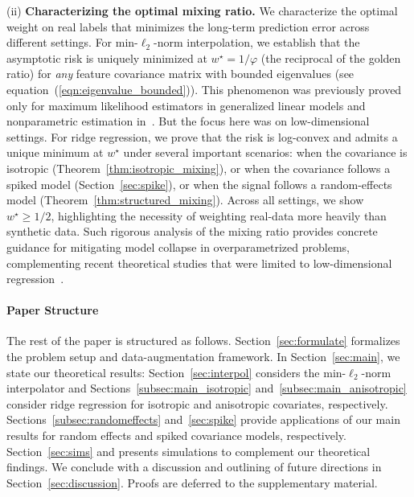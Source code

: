 \documentclass[10pt]{article}
\def\eqref#1{equation~(\ref{#1})}
\numberwithin{thm}{section}
\numberwithin{remark}{section}
\numberwithin{ex}{section}
\numberwithin{ass}{section}
\numberwithin{defn}{section}
\numberwithin{lemma}{section}
\numberwithin{corollary}{section}
\numberwithin{prop}{section}
\numberwithin{equation}{section}
\begin{document}
(ii) \textbf{Characterizing the optimal mixing ratio.}
We characterize the optimal weight on real labels that minimizes the long-term prediction error across different settings.
For min-$\ell_2$-norm interpolation, we establish that the asymptotic risk is uniquely minimized at $w^\star = 1/\varphi$ (the reciprocal of the golden ratio) for \emph{any} feature covariance matrix with bounded eigenvalues (see \eqref{eqn:eigenvalue_bounded}).
This phenomenon was previously proved only for maximum likelihood estimators in generalized linear models and nonparametric estimation in~\cite{he2025golden}. But the focus here was on low-dimensional settings. For ridge regression, we prove that the risk is log-convex and admits a unique minimum at $w^\star$ under several important scenarios:  when the covariance is isotropic (Theorem~\ref{thm:isotropic_mixing}), or when the covariance follows a spiked model (Section~\ref{sec:spike}), or when the signal follows a random-effects model (Theorem~\ref{thm:structured_mixing}). Across all settings, we show $w^\star \geq 1/2$, highlighting the necessity of weighting real-data more heavily than synthetic data. Such rigorous analysis of the mixing ratio provides concrete guidance for mitigating model collapse in overparametrized problems, complementing recent theoretical studies that were limited to low-dimensional regression~\cite{gerstgrasser2024inevitable,dey2024universality}.

\paragraph{Paper Structure}
The rest of the paper is structured as follows. Section~\ref{sec:formulate} formalizes the problem setup and data-augmentation framework. In Section~\ref{sec:main}, we state our theoretical results: Section~\ref{sec:interpol} considers the min-$\ell_2$-norm interpolator and Sections~\ref{subsec:main_isotropic} and~\ref{subsec:main_anisotropic} consider ridge regression for isotropic and anisotropic covariates, respectively. Sections~\ref{subsec:randomeffects} and~\ref{sec:spike} provide applications of our main results for random effects and spiked covariance models, respectively.
Section~\ref{sec:sims} and presents simulations to complement our theoretical findings. We conclude with a discussion and outlining of future directions in Section~\ref{sec:discussion}. Proofs are deferred to the supplementary material.
\end{document}
